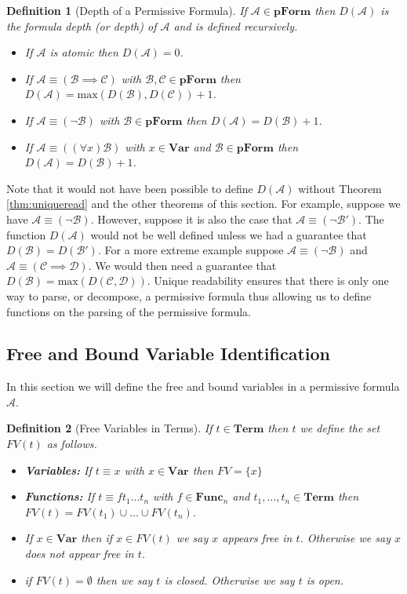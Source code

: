 \documentclass[12pt]{article}
\theoremstyle{break}
\newtheorem{definition}{Definition}[section]
\theoremstyle{break}
\theoremstyle{break}
\theoremstyle{break}
\theoremstyle{break}
\newtheorem{informal definition}[definition]{Informal Definition}
\newcommand{\mc}[1]{\mathcal{#1}}
\begin{document}
\begin{definition}[Depth of a Permissive Formula]
If $\mc{A}\in\textbf{pForm}$ then $D(\mc{A})$ is the formula depth (or depth) of $\mc{A}$ and is defined recursively.
\begin{itemize}
\item{If $\mc{A}$ is atomic then $D(\mc{A}) = 0$.}
\item{If $\mc{A} \equiv (\mc{B} \implies \mc{C})$ with $\mc{B}, \mc{C} \in \textbf{pForm}$ then $D(\mc{A}) = \text{max}(D(\mc{B}), D(\mc{C})) + 1$.}
\item{If $\mc{A} \equiv (\lnot \mc{B})$ with $\mc{B}\in\textbf{pForm}$ then $D(\mc{A}) = D(\mc{B}) + 1$.}
\item{If $\mc{A} \equiv ((\forall x) \mc{B})$ with $x\in\textbf{Var}$ and $\mc{B} \in \textbf{pForm}$ then $D(\mc{A}) = D(\mc{B}) + 1$.}
\end{itemize}
\end{definition}

Note that it would not have been possible to define $D(\mc{A})$ without Theorem \ref{thm:uniqueread} and the other theorems of this section.
For example, suppose we have $\mc{A} \equiv (\lnot \mc{B})$.
However, suppose it is also the case that $\mc{A} \equiv (\lnot \mc{B}')$.
The function $D(\mc{A})$ would not be well defined unless we had a guarantee that $D(\mc{B}) = D(\mc{B}')$.
For a more extreme example suppose $\mc{A} \equiv (\lnot \mc{B})$ and $\mc{A} \equiv (\mc{C} \implies \mc{D})$.
We would then need a guarantee that $D(\mc{B}) = \text{max}(D(\mc{C}, \mc{D}))$.
Unique readability ensures that there is only one way to parse, or decompose, a permissive formula thus allowing us to define functions on the parsing of the permissive formula.

\subsection{Free and Bound Variable Identification}

In this section we will define the free and bound variables in a permissive formula $\mc{A}$.


\begin{definition}[Free Variables in Terms]
If $t\in \textbf{Term}$ then $t$ we define the set $FV(t)$ as follows.
\begin{itemize}
\item{\textbf{Variables:} If $t\equiv x$ with $x\in\textbf{Var}$ then $FV = \{x\}$}
\item{\textbf{Functions:} If $t\equiv ft_1\ldots t_n$ with $f\in\textbf{Func}_n$ and $t_1,\ldots,t_n \in \textbf{Term}$ then $FV(t) = FV(t_1)\cup\ldots \cup FV(t_n)$.}
\item{If $x\in \textbf{Var}$ then if $x\in FV(t)$ we say $x$ appears free in $t$. Otherwise we say $x$ does not appear free in $t$.}
\item{if $FV(t)=\emptyset$ then we say $t$ is closed. Otherwise we say $t$ is open.}
\end{itemize}
\end{definition}
\end{document}
